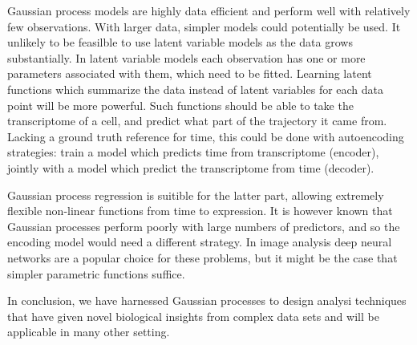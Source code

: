 Gaussian process models are highly data efficient and perform well with relatively few observations. With larger data, simpler models could potentially be used. It unlikely to be feasilble to use latent variable models as the data grows substantially. In latent variable models each observation has one or more parameters associated with them, which need to be fitted. Learning latent functions which summarize the data instead of latent variables for each data point will be more powerful. Such functions should be able to take the transcriptome of a cell, and predict what part of the trajectory it came from. Lacking a ground truth reference for time, this could be done with autoencoding strategies: train a model which predicts time from transcriptome (encoder), jointly with a model which predict the transcriptome from time (decoder).

Gaussian process regression is suitible for the latter part, allowing extremely flexible non-linear functions from time to expression. It is however known that Gaussian processes perform poorly with large numbers of predictors, and so the encoding model would need a different strategy. In image analysis deep neural networks are a popular choice for these problems, but it might be the case that simpler parametric functions suffice.

In conclusion, we have harnessed Gaussian processes to design analysi techniques that have given novel biological insights from complex data sets and will be applicable in many other setting.
